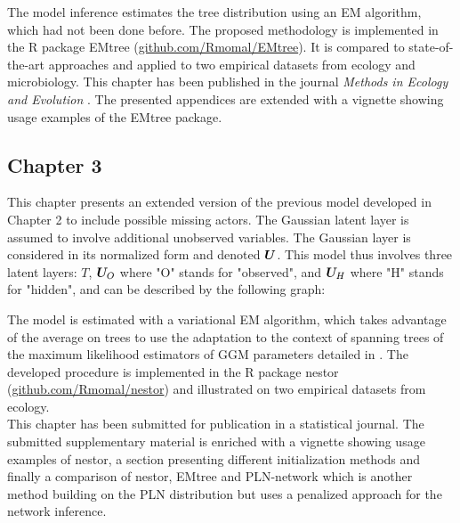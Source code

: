 The model inference estimates the tree distribution using an EM algorithm, which had not been done before. The proposed methodology is implemented in the R package EMtree (\url{github.com/Rmomal/EMtree}). It is compared to state-of-the-art approaches and applied to two empirical datasets from ecology and microbiology. This chapter has been published in the journal \textit{Methods in Ecology and Evolution} \citep{MRA20}. The presented appendices are extended with a vignette showing usage examples of the EMtree package.

    \subsection*{Chapter 3}
This chapter presents an extended version of the previous model developed in Chapter 2 to include possible missing actors. The Gaussian latent layer is assumed to involve additional unobserved variables. The Gaussian layer is considered in its normalized form and denoted ${\boldsymbol{U}}$.  This model thus involves three latent layers: $T$, ${\boldsymbol{U}}_O$ where "O" stands for "observed", and ${\boldsymbol{U}}_H$ where "H" stands for "hidden", and can be described by the following graph:
 
 \begin{center}
	  \end{center}
 
 The model is estimated with a variational EM algorithm, which takes advantage of the average on trees to use the adaptation to the context of spanning trees of the maximum likelihood estimators of GGM parameters detailed in \citet{Lau96}. The developed procedure is implemented in the R package nestor (\url{github.com/Rmomal/nestor}) and illustrated on two  empirical datasets from ecology. \\

This chapter has been submitted for publication in a statistical journal. The submitted supplementary material is enriched with a vignette showing usage examples of nestor, a section presenting different initialization methods and finally a comparison of nestor, EMtree and  PLN-network which is another method building on the PLN distribution but uses a penalized approach for the network inference.

